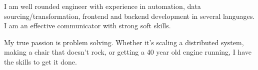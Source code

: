 

\begin{cvparagraph}

 I am well rounded engineer with experience in automation, data sourcing/transformation, frontend and backend development in several languages. I am an effective communicator with strong soft skills. 

My true passion is problem solving. Whether it's scaling a distributed system, making a chair that doesn't rock, or getting a 40 year old engine running, I have the skills to get it done.  
\end{cvparagraph}
